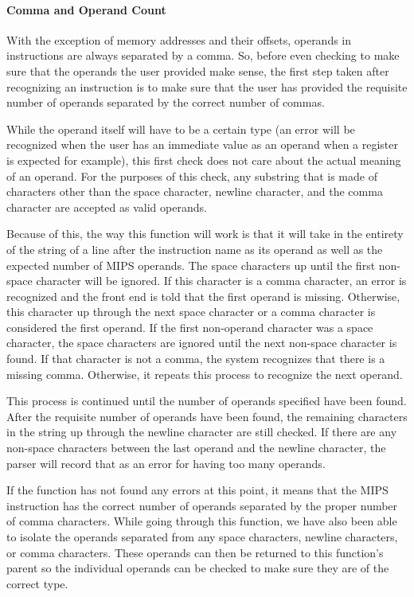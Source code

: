 \documentclass[
    paper=letter,
    parskip=half,
    fontsize=12pt,
    titlepage=firstiscover,
    toc=bibliography,
    numbers=endperiod
]{scrartcl}
\begin{document}
\paragraph{Comma and Operand Count}
\label{subsec:comma-and-operand-count}

With the exception of memory addresses and their offsets, operands in
instructions are always separated by a comma. So, before even checking
to make sure that the operands the user provided make sense, the first
step taken after recognizing an instruction is to make sure that the
user has provided the requisite number of operands separated by the
correct number of commas.

While the operand itself will have to be a certain type (an error will
be recognized when the user has an immediate value as an operand when a
register is expected for example), this first check does not care about
the actual meaning of an operand. For the purposes of this check, any
substring that is made of characters other than the space character,
newline character, and the comma character are accepted as valid
operands.

Because of this, the way this function will work is that it will take in
the entirety of the string of a line after the instruction name as its
operand as well as the expected number of MIPS operands. The space
characters up until the first non-space character will be ignored. If
this character is a comma character, an error is recognized and the
front end is told that the first operand is missing. Otherwise, this
character up through the next space character or a comma character is
considered the first operand. If the first non-operand character was a
space character, the space characters are ignored until the next
non-space character is found. If that character is not a comma, the
system recognizes that there is a missing comma. Otherwise, it repeats
this process to recognize the next operand.

This process is continued until the number of operands specified have
been found. After the requisite number of operands have been found, the
remaining characters in the string up through the newline character are
still checked. If there are any non-space characters between the last
operand and the newline character, the parser will record that as an
error for having too many operands.

If the function has not found any errors at this point, it means that
the MIPS instruction has the correct number of operands separated by the
proper number of comma characters. While going through this function, we
have also been able to isolate the operands separated from any space
characters, newline characters, or comma characters. These operands can
then be returned to this function's parent so the individual operands
can be checked to make sure they are of the correct type.
\end{document}
